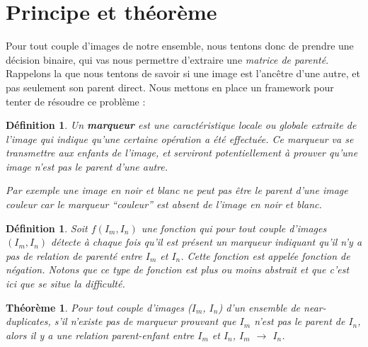 \documentclass[utf8,final]{stageM2R} %
\begin{document}
\section{Principe et théorème}
\label{sec:method}
Pour tout couple d'images de notre ensemble, nous tentons donc de prendre une décision binaire, qui vas nous permettre d'extraire une \textit{matrice de parenté}. Rappelons la que nous tentons de savoir si une image est l'ancêtre d'une autre, et pas seulement son parent direct. Nous mettons en place un framework pour tenter de résoudre ce problème : 

\newtheorem*{marqueur}{Définition}
\begin{marqueur}
  Un \textbf{marqueur} est une caractéristique locale ou globale extraite de l'image qui indique qu'une certaine opération a été effectuée. Ce marqueur va se transmettre aux enfants de l'image, et serviront potentiellement à prouver qu'une image n'est pas le parent d'une autre.

Par exemple une image en noir et blanc ne peut pas être le parent d'une image couleur car le marqueur ``couleur'' est absent de l'image en noir et blanc.
\end{marqueur}

\newtheorem*{fonction}{Définition}
\begin{fonction}
  Soit $f(I_{m},I_{n})$ une fonction qui pour tout couple d'images $(I_{m}, I_{n})$ détecte à chaque fois qu'il est présent un marqueur indiquant qu'il n'y a pas de relation de parenté entre $I_{m}$ et $I_{n}$. Cette fonction est appelée fonction de négation. Notons que ce type de fonction est plus ou moins abstrait et que c'est ici que se situe la difficulté.
\end{fonction}

\newtheorem*{parentage}{Théorème}
\begin{parentage}
  Pour tout couple d'images ($I_{m}$, $I_{n}$) d'un ensemble de near-duplicates, s'il n'existe pas de marqueur prouvant que $I_{m}$ n'est pas le parent de $I_{n}$, alors il y a une relation parent-enfant entre $I_{m}$ et $I_{n}$, $I_{m}$ $\to$ $I_{n}$.
\end{parentage}
\end{document}
